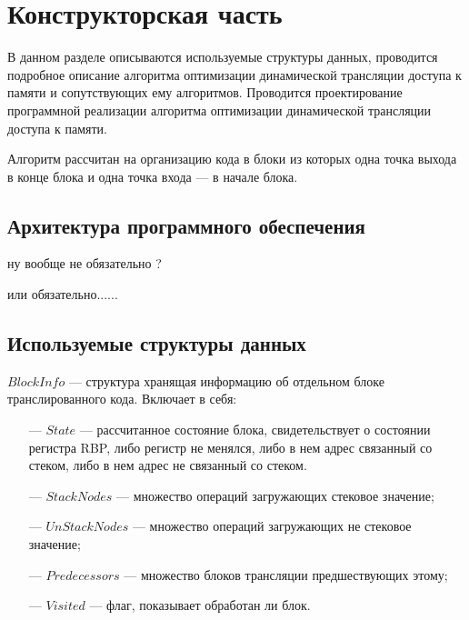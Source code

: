 \section{Конструкторская часть}

В данном разделе описываются используемые структуры данных, проводится
подробное описание алгоритма оптимизации динамической трансляции доступа к памяти и сопутствующих ему алгоритмов. Проводится проектирование программной реализации алгоритма оптимизации динамической трансляции доступа к памяти.

Алгоритм рассчитан на организацию кода в блоки из которых одна точка выхода в конце блока и одна точка входа --- в начале блока.

\subsection{Архитектура программного обеспечения}

ну вообще не обязательно ?

или обязательно...... 

\subsection{Используемые структуры данных}

$BlockInfo$ --- структура хранящая информацию об отдельном блоке транслированного кода. Включает в себя:

\begin{itemize}[leftmargin=1.6\parindent]
	\item[---] $State$ --- рассчитанное состояние блока, свидетельствует о состоянии регистра RBP, либо регистр не менялся, либо в нем адрес связанный со стеком, либо в нем адрес не связанный со стеком.
	\item[---] $StackNodes$ --- множество операций загружающих стековое значение;
	\item[---] $UnStackNodes$ --- множество операций загружающих не стековое значение;
	\item[---] $Predecessors$ --- множество блоков трансляции предшествующих этому;
	\item[---] $Visited$ --- флаг, показывает обработан ли блок.
\end{itemize}


\begin{comment}
{
	+  int State = NOT_CHANGED;
	+  std::set<OrderedNode*> StackNodes;
	+  std::set<OrderedNode*> UnStackNodes;
	+  std::vector<OrderedNode*> Predecessors;
	+  // std::vector<OrderedNode*> Successors;
	+  bool Visited = false;
	+};
+
\end{comment}

